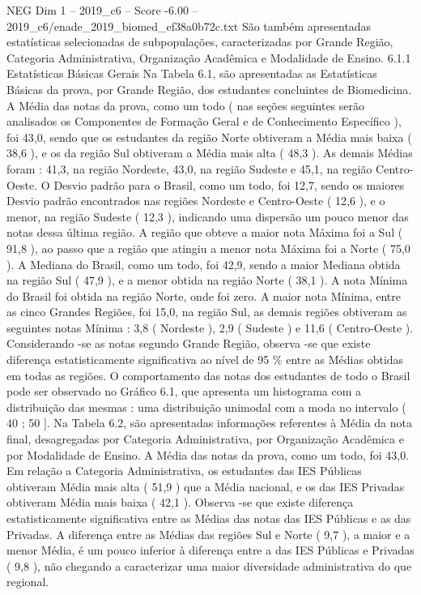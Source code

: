 \begin{textsample}{NEG Dim 1 – 2019\_c6 – Score -6.00 – 2019\_c6/enade\_2019\_biomed\_ef38a0b72c.txt}
São também apresentadas estatísticas selecionadas de subpopulações, caracterizadas por Grande Região, Categoria Administrativa, Organização Acadêmica e Modalidade de Ensino. 6.1.1 Estatísticas Básicas Gerais Na Tabela 6.1, são apresentadas as Estatísticas Básicas da prova, por Grande Região, dos estudantes concluintes de Biomedicina.
A Média das notas da prova, como um todo ( nas seções seguintes serão analisados os Componentes de Formação Geral e de Conhecimento Específico ), foi 43,0, sendo que os estudantes da região Norte obtiveram a Média mais baixa ( 38,6 ), e os da região Sul obtiveram a Média mais alta ( 48,3 ).
As demais Médias foram : 41,3, na região Nordeste, 43,0, na região Sudeste e 45,1, na região Centro-Oeste.
O Desvio padrão para o Brasil, como um todo, foi 12,7, sendo os maiores Desvio padrão encontrados nas regiões Nordeste e Centro-Oeste ( 12,6 ), e o menor, na região Sudeste ( 12,3 ), indicando uma dispersão um pouco menor das notas dessa última região.
A região que obteve a maior nota Máxima foi a Sul ( 91,8 ), ao passo que a região que atingiu a menor nota Máxima foi a Norte ( 75,0 ).
A Mediana do Brasil, como um todo, foi 42,9, sendo a maior Mediana obtida na região Sul ( 47,9 ), e a menor obtida na região Norte ( 38,1 ).
A nota Mínima do Brasil foi obtida na região Norte, onde foi zero.
A maior nota Mínima, entre as cinco Grandes Regiões, foi 15,0, na região Sul, as demais regiões obtiveram as seguintes notas Mínima : 3,8 ( Nordeste ), 2,9 ( Sudeste ) e 11,6 ( Centro-Oeste ).
Considerando -se as notas segundo Grande Região, observa -se que existe diferença estatisticamente significativa ao nível de 95 \% entre as Médias obtidas em todas as regiões.
O comportamento das notas dos estudantes de todo o Brasil pode ser observado no Gráfico 6.1, que apresenta um histograma com a distribuição das mesmas : uma distribuição unimodal com a moda no intervalo ( 40 ; 50 ].
Na Tabela 6.2, são apresentadas informações referentes à Média da nota final, desagregadas por Categoria Administrativa, por Organização Acadêmica e por Modalidade de Ensino.
A Média das notas da prova, como um todo, foi 43,0.
Em relação a Categoria Administrativa, os estudantes das IES Públicas obtiveram Média mais alta ( 51,9 ) que a Média nacional, e os das IES Privadas obtiveram Média mais baixa ( 42,1 ).
Observa -se que existe diferença estatisticamente significativa entre as Médias das notas das IES Públicas e as das Privadas.
A diferença entre as Médias das regiões Sul e Norte ( 9,7 ), a maior e a menor Média, é um pouco inferior à diferença entre a das IES Públicas e Privadas ( 9,8 ), não chegando a caracterizar uma maior diversidade administrativa do que regional.

\end{textsample}
